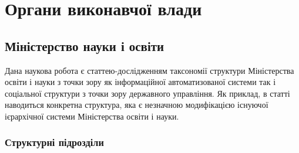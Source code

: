 \chapter{Органи виконавчої влади}

\section{Міністерство науки і освіти}

Дана наукова робота є статтею-дослідженням таксономії структури Міністерства освіти і науки з точки зору як інформаційної автоматизованої системи так і соціальної структури з точки зору державного управління. Як приклад, в статті наводиться конкретна структура, яка є незначною модифікацією існуючої ієрархічної системи Міністерства освіти і науки.

\subsection{Структурні підрозділи}

